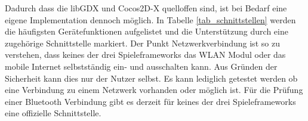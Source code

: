 Dadurch dass die libGDX und Cocos2D-X quelloffen sind, ist bei Bedarf eine eigene Implementation dennoch möglich. In Tabelle \ref{tab_schnittstellen} werden die häufigsten Gerätefunktionen aufgelistet und die Unterstützung durch eine zugehörige Schnittstelle markiert. Der Punkt Netzwerkverbindung  ist so zu verstehen, dass keines der drei Spieleframeworks das WLAN Modul oder das mobile Internet selbstständig ein- und ausschalten kann. Aus Gründen der Sicherheit kann dies nur der Nutzer selbst. Es kann lediglich getestet werden ob eine Verbindung zu einem Netzwerk vorhanden oder möglich ist. Für die Prüfung einer Bluetooth Verbindung gibt es derzeit für keines der drei Spieleframeworks eine offizielle Schnittstelle.

\begin{table}[htbp]
	\centering
\end{table}
